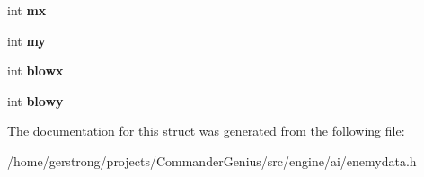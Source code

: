 \begin{DoxyCompactItemize}
\item 
\hypertarget{structst_s_e_data_a0404e7ebd1e511aba1f46d236e3fdb7e}{
int {\bfseries mx}}
\label{structst_s_e_data_a0404e7ebd1e511aba1f46d236e3fdb7e}

\item 
\hypertarget{structst_s_e_data_a7a5343b3af938580cebb7283e2cf780f}{
int {\bfseries my}}
\label{structst_s_e_data_a7a5343b3af938580cebb7283e2cf780f}

\item 
\hypertarget{structst_s_e_data_aba7134eb92bf6fa631c057e4b017d3cf}{
int {\bfseries blowx}}
\label{structst_s_e_data_aba7134eb92bf6fa631c057e4b017d3cf}

\item 
\hypertarget{structst_s_e_data_af0c58c980e105b31ac22608977b3953f}{
int {\bfseries blowy}}
\label{structst_s_e_data_af0c58c980e105b31ac22608977b3953f}

\end{DoxyCompactItemize}


The documentation for this struct was generated from the following file:\begin{DoxyCompactItemize}
\item 
/home/gerstrong/projects/CommanderGenius/src/engine/ai/enemydata.h\end{DoxyCompactItemize}

